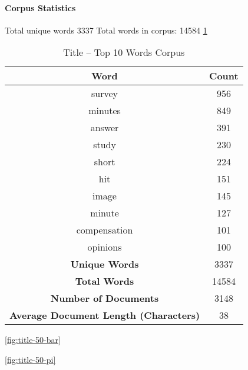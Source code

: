 \documentclass[letterpaper,12pt]{article}
\begin{document}
\paragraph{Corpus Statistics}
Total unique words 3337
Total words in corpus: 14584
\ref{tab:title_top_words}

\begin{table}
	\caption{\label{tab:title_top_words} Title -- Top 10 Words Corpus}
	\begin{center}
		\begin{tabular}{|c|c|}
			\hline
			\textbf{Word} & \textbf{Count} \\
			\hline
			survey & 956 \\
			\hline
			minutes & 849 \\
			\hline
			answer & 391 \\
			\hline
			study & 230 \\
			\hline
			short & 224 \\
			\hline
			hit & 151 \\
			\hline
			image & 145 \\
			\hline
			minute & 127 \\
			\hline
			compensation & 101 \\
			\hline
			opinions & 100 \\
			\hline
			\textbf{Unique Words} & 3337 \\
			\hline
			\textbf{Total Words} & 14584 \\
			\hline
			\textbf{Number of Documents} & 3148 \\
			\hline
			\textbf{Average Document Length (Characters)} & 38 \\
			\hline
		\end{tabular}
	\end{center}
\end{table}

\ref{fig:title-50-bar}

\ref{fig:title-50-pi}

\newpage
\end{document}
